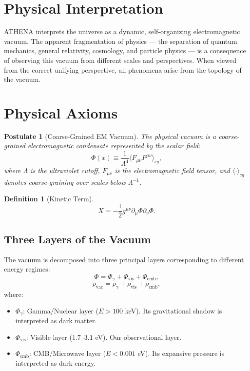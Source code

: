 \documentclass[12pt,oneside]{book}
\newtheorem{definition}{Definition}[chapter]
\newtheorem{postulate}{Postulate}[chapter]
\begin{document}
\section{Physical Interpretation}

ATHENA interprets the universe as a dynamic, self-organizing electromagnetic vacuum. The apparent fragmentation of physics — the separation of quantum mechanics, general relativity, cosmology, and particle physics — is a consequence of observing this vacuum from different scales and perspectives. When viewed from the correct unifying perspective, all phenomena arise from the topology of the vacuum.

\section{Physical Axioms}

\begin{postulate}[Coarse-Grained EM Vacuum]
The physical vacuum is a coarse-grained electromagnetic condensate represented by the scalar field:
\[
\Phi(x) \equiv \frac{1}{\Lambda^4} \langle F_{\mu\nu} F^{\mu\nu} \rangle_{cg},
\]
where $\Lambda$ is the ultraviolet cutoff, $F_{\mu\nu}$ is the electromagnetic field tensor, and $\langle \cdot \rangle_{cg}$ denotes coarse-graining over scales below $\Lambda^{-1}$.
\end{postulate}

\begin{definition}[Kinetic Term]
\[
X = -\frac{1}{2} g^{\mu\nu} \partial_\mu\Phi \partial_\nu\Phi.
\]
\end{definition}

\subsection{Three Layers of the Vacuum}

The vacuum is decomposed into three principal layers corresponding to different energy regimes:
\[
\Phi = \Phi_\gamma + \Phi_{\text{vis}} + \Phi_{\text{cmb}},
\]
\[
\rho_{\text{vac}} = \rho_\gamma + \rho_{\text{vis}} + \rho_{\text{cmb}},
\]
where:
\begin{itemize}
    \item $\Phi_\gamma$: Gamma/Nuclear layer ($E > 100$ keV). Its gravitational shadow is interpreted as dark matter.
    \item $\Phi_{\text{vis}}$: Visible layer ($1.7$--$3.1$ eV). Our observational layer.
    \item $\Phi_{\text{cmb}}$: CMB/Microwave layer ($E < 0.001$ eV). Its expansive pressure is interpreted as dark energy.
\end{itemize}
\end{document}
